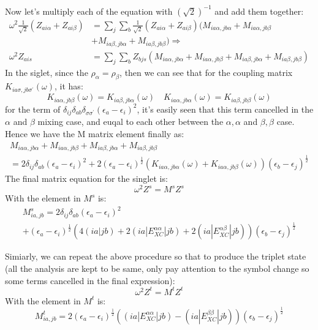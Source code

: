 Now let's multiply each of the equation with $(\sqrt{2})^{-1}$ and add
them together:
\begin{align}
 \omega^{2} \frac{1}{\sqrt{2}}(Z_{ai\alpha} + Z_{ai\beta})
&= \sum_{j}\sum_{b}\frac{1}{\sqrt{2}}(Z_{ai\alpha} +
Z_{ai\beta}) (M_{ia\alpha, jb\alpha} + M_{ia\alpha, jb\beta}\nonumber \\
& +M_{ia\beta, jb\alpha} +M_{ia\beta, jb\beta} ) \Rightarrow \nonumber
\\
\omega^{2} Z_{ais} &= \sum_{j}\sum_{b} Z_{bjs} (M_{ia\alpha, jb\alpha} +
M_{ia\alpha, jb\beta} +M_{ia\beta, jb\alpha} +M_{ia\beta, jb\beta} )
\end{align} 
In the siglet, since the $\rho_{\alpha} = \rho_{\beta}$, then we can
see that for the coupling matrix $K_{ia\sigma,
jb\sigma^{'}}(\omega)$, it has:
\begin{equation*}
 K_{ia\alpha, jb\beta}(\omega) = K_{ia\beta, jb\alpha}(\omega) \quad 
 K_{ia\alpha, jb\alpha}(\omega) = K_{ia\beta, jb\beta}(\omega)
\end{equation*}
for the term of
$\delta_{ij}\delta_{ab}\delta_{\sigma\sigma^{'}}(\epsilon_{a} -
\epsilon_{i})^{2}$, it's easily seen that this term cancelled in the
$\alpha$ and $\beta$ mixing case, and euqal to each other between the
$\alpha, \alpha$ and $\beta, \beta$ case. Hence we have the M matrix
element finally as:
\begin{multline}
 M_{ia\alpha, jb\alpha} +
M_{ia\alpha, jb\beta} +M_{ia\beta, jb\alpha} +M_{ia\beta, jb\beta} \\
= 
2\delta_{ij}\delta_{ab}(\epsilon_{a} - \epsilon_{i})^{2} + 
2(\epsilon_{a} - \epsilon_{i})^{\frac{1}{2}} 
(K_{ia\alpha, jb\alpha}(\omega) +
K_{ia\alpha, jb\beta}(\omega))(\epsilon_{b} -
\epsilon_{j})^{\frac{1}{2}}
\end{multline} 
The final matrix equation for the singlet is:
\begin{equation}
  \omega^{2}Z^{s} = M^{s}Z^{s}
\end{equation} 
With the element in $M^{s}$ is:
\begin{multline}
 M^{s}_{ia,jb} = 2\delta_{ij}\delta_{ab}(\epsilon_{a} -
\epsilon_{i})^{2} \\
+ (\epsilon_{a} - \epsilon_{i})^{\frac{1}{2}} 
(4(ia|jb) +2(ia|E^{\alpha\alpha}_{XC}|jb) + 
2(ia|E^{\alpha\beta}_{XC}|jb))(\epsilon_{b} -
\epsilon_{j})^{\frac{1}{2}}
\end{multline}

Simiarly, we can repeat the above procedure so that to produce the
triplet state (all the analysis are kept to be same, only pay attention
to the symbol change so some terms cancelled in the final expression):
\begin{equation}
  \omega^{2}Z^{t} = M^{t}Z^{t}
\end{equation} 
With the element in $M^{t}$ is:
\begin{equation}
 M^{t}_{ia,jb} = 2(\epsilon_{a} - \epsilon_{i})^{\frac{1}{2}} 
((ia|E^{\alpha\alpha}_{XC}|jb) - 
(ia|E^{\beta\beta}_{XC}|jb))(\epsilon_{b} -
\epsilon_{j})^{\frac{1}{2}}
\end{equation}




